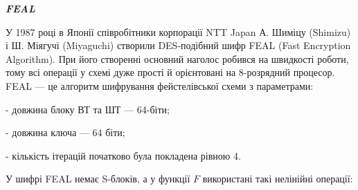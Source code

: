 \bigskip


\bigskip

{\centering\bfseries\itshape
FEAL
\par}


\bigskip

У 1987 році в Японії співробітники корпорації NTT Japan А. Шиміцу (Shimizu) і Ш.
Міягучі (Miyaguchi) створили DES-подібний шифр FEAL (Fast Encryption
Algorithm). При його створенні основний наголос робився на швидкості роботи,
тому всі операції у схемі дуже прості й орієнтовані на 8-розрядний процесор.
FEAL  --- це алгоритм шифрування фейстелівської схеми з параметрами:

{}- довжина блоку ВТ та ШТ --- 64-біти; 

{}- довжина ключа --- 64 біти;

{}- кількість ітерацій початково була покладена рівною 4.

У шифрі FEAL немає S-блоків, а у функції  $F$ використані такі нелінійні
операції:


